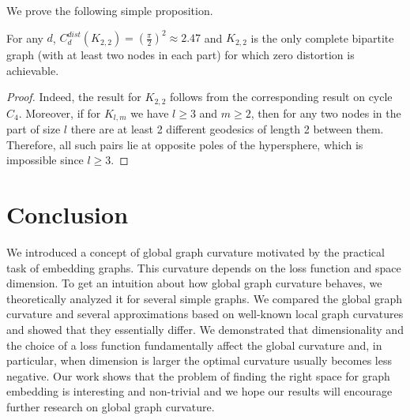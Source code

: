 \documentclass[runningheads]{llncs}
\begin{document}
We prove the following simple proposition.

\begin{proposition}\label{prop:bipartite_distortion}
For any $d$, $C_d^{dist}(K_{2,2}) = \left(\frac{\pi}{2}\right)^2 \approx 2.47$ and $K_{2,2}$ is the only complete bipartite graph (with at least two nodes in each part) for which zero distortion is achievable.
\end{proposition}

\begin{proof}
Indeed, the result for $K_{2,2}$ follows from the corresponding result on cycle $C_4$. Moreover, if for $K_{l,m}$ we have $l \ge 3$ and $m \ge 2$, then for any two nodes in the part of size $l$ there are at least 2 different geodesics of length 2 between them. Therefore, all such pairs lie at opposite poles of the hypersphere, which is impossible since $l \ge 3$.
\end{proof}


\section{Conclusion}

We introduced a concept of global graph curvature motivated by the practical task of embedding graphs. This curvature depends on the loss function and space dimension. To get an intuition about how global graph curvature behaves, we theoretically analyzed it for several simple graphs. We compared the global graph curvature and several approximations based on well-known local graph curvatures and showed that they essentially differ. We demonstrated that dimensionality and the choice of a loss function fundamentally affect the global curvature and, in particular, when dimension is larger the optimal curvature usually becomes less negative. Our work shows that the problem of finding the right space for graph embedding is interesting and non-trivial and we hope our results will encourage further research on global graph curvature.
\end{document}
